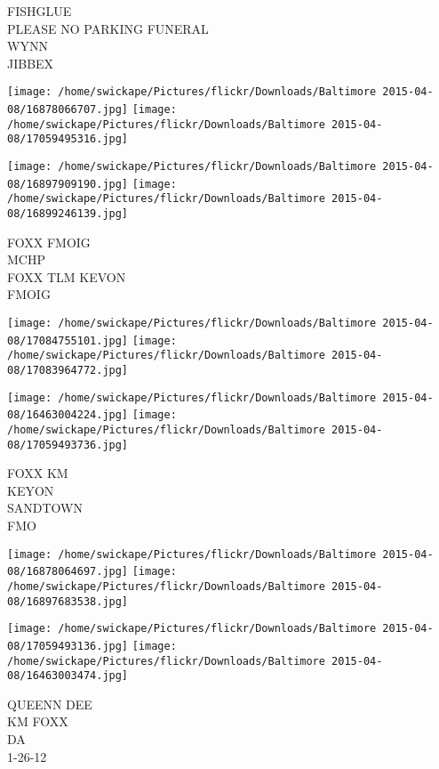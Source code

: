 \documentclass[10pt,letterpaper]{article}
\begin{document}
FISHGLUE\\
PLEASE NO PARKING FUNERAL\\
WYNN\\
JIBBEX\\
\pagebreak

\texttt{[image: /home/swickape/Pictures/flickr/Downloads/Baltimore 2015-04-08/16878066707.jpg]}
\texttt{[image: /home/swickape/Pictures/flickr/Downloads/Baltimore 2015-04-08/17059495316.jpg]}

\texttt{[image: /home/swickape/Pictures/flickr/Downloads/Baltimore 2015-04-08/16897909190.jpg]}
\texttt{[image: /home/swickape/Pictures/flickr/Downloads/Baltimore 2015-04-08/16899246139.jpg]}

FOXX FMOIG\\
MCHP\\
FOXX TLM KEVON\\
FMOIG\\
\pagebreak

\texttt{[image: /home/swickape/Pictures/flickr/Downloads/Baltimore 2015-04-08/17084755101.jpg]}
\texttt{[image: /home/swickape/Pictures/flickr/Downloads/Baltimore 2015-04-08/17083964772.jpg]}

\texttt{[image: /home/swickape/Pictures/flickr/Downloads/Baltimore 2015-04-08/16463004224.jpg]}
\texttt{[image: /home/swickape/Pictures/flickr/Downloads/Baltimore 2015-04-08/17059493736.jpg]}

FOXX KM\\
KEYON\\
SANDTOWN\\
FMO\\
\pagebreak

\texttt{[image: /home/swickape/Pictures/flickr/Downloads/Baltimore 2015-04-08/16878064697.jpg]}
\texttt{[image: /home/swickape/Pictures/flickr/Downloads/Baltimore 2015-04-08/16897683538.jpg]}

\texttt{[image: /home/swickape/Pictures/flickr/Downloads/Baltimore 2015-04-08/17059493136.jpg]}
\texttt{[image: /home/swickape/Pictures/flickr/Downloads/Baltimore 2015-04-08/16463003474.jpg]}

QUEENN DEE\\
KM FOXX\\
DA\\
1{-}26{-}12\\
\pagebreak
\end{document}
